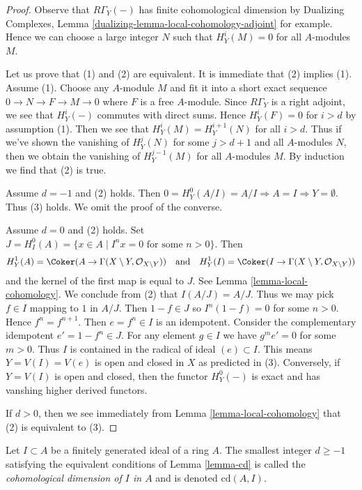 \begin{proof}
Observe that $R\Gamma_Y(-)$ has finite cohomological dimension by
Dualizing Complexes, Lemma \ref{dualizing-lemma-local-cohomology-adjoint}
for example. Hence we can choose a large integer $N$ such that
$H^i_Y(M) = 0$ for all $A$-modules $M$.

\medskip\noindent
Let us prove that (1) and (2) are equivalent. It is immediate that
(2) implies (1). Assume (1). Choose any $A$-module $M$ and fit it into
a short exact sequence $0 \to N \to F \to M \to 0$ where $F$ is a
free $A$-module. Since $R\Gamma_Y$ is a right adjoint, we see that
$H^i_Y(-)$ commutes with direct sums. Hence $H^i_Y(F) = 0$
for $i > d$ by assumption (1). Then we see that
$H^i_Y(M) = H^{i + 1}_Y(N)$ for all $i > d$.
Thus if we've shown the vanishing of $H^j_Y(N)$ for some
$j > d + 1$ and all $A$-modules $N$, then we obtain the
vanishing of $H^{j - 1}_Y(M)$ for all $A$-modules $M$.
By induction we find that (2) is true.

\medskip\noindent
Assume $d = -1$ and (2) holds. Then $0 = H^0_Y(A/I) = A/I \Rightarrow A = I
\Rightarrow Y = \emptyset$. Thus (3) holds. We omit the proof of the converse.

\medskip\noindent
Assume $d = 0$ and (2) holds. Set
$J = H^0_I(A) = \{x \in A \mid I^nx = 0 \text{ for some }n > 0\}$.
Then
$$
H^1_Y(A) = \Coker(A \to \Gamma(X \setminus Y, \mathcal{O}_{X \setminus Y}))
\quad\text{and}\quad
H^1_Y(I) = \Coker(I \to \Gamma(X \setminus Y, \mathcal{O}_{X \setminus Y}))
$$
and the kernel of the first map is equal to $J$. See
Lemma \ref{lemma-local-cohomology}.
We conclude from (2) that $I(A/J) = A/J$.
Thus we may pick $f \in I$
mapping to $1$ in $A/J$. Then $1 - f \in J$ so $I^n(1 - f) = 0$ for some
$n > 0$. Hence $f^n = f^{n + 1}$. Then $e = f^n \in I$ is an idempotent.
Consider the complementary idempotent $e' = 1 - f^n \in J$.
For any element $g \in I$ we have $g^m e' = 0$ for some $m > 0$.
Thus $I$ is contained in the radical of ideal $(e) \subset I$.
This means $Y = V(I) = V(e)$ is open and closed in $X$ as predicted in (3).
Conversely, if $Y = V(I)$ is open and closed, then the functor
$H^0_Y(-)$ is exact and has vanshing higher derived functors.

\medskip\noindent
If $d > 0$, then we see immediately from
Lemma \ref{lemma-local-cohomology} that (2) is equivalent to (3).
\end{proof}

\begin{definition}
\label{definition-cd}
Let $I \subset A$ be a finitely generated ideal of a ring $A$.
The smallest integer $d \geq -1$ satisfying the equivalent conditions
of Lemma \ref{lemma-cd} is called the
{\it cohomological dimension of $I$ in $A$} and is
denoted $\text{cd}(A, I)$.
\end{definition}

